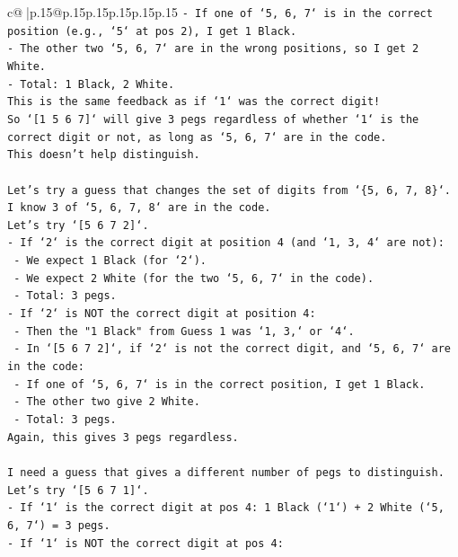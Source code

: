 \documentclass{article}
\begin{document}
{\begin{supertabular}{c@{$\;$}|p{.15\linewidth}@{}p{.15\linewidth}p{.15\linewidth}p{.15\linewidth}p{.15\linewidth}p{.15\linewidth}}
{{{\texttt{{-} If one of `5, 6, 7` is in the correct position (e.g., `5` at pos 2), I get 1 Black.} \\
\texttt{{-} The other two `5, 6, 7` are in the wrong positions, so I get 2 White.} \\
\texttt{{-} Total: 1 Black, 2 White.} \\
\texttt{This is the same feedback as if `1` was the correct digit!} \\
\texttt{So `{[}1 5 6 7{]}` will give 3 pegs regardless of whether `1` is the correct digit or not, as long as `5, 6, 7` are in the code.} \\
\texttt{This doesn't help distinguish.} \\
\\ 
\texttt{Let's try a guess that changes the set of digits from `\{5, 6, 7, 8\}`.} \\
\texttt{I know 3 of `5, 6, 7, 8` are in the code.} \\
\texttt{Let's try `{[}5 6 7 2{]}`.} \\
\texttt{{-} If `2` is the correct digit at position 4 (and `1, 3, 4` are not):} \\
\texttt{  {-} We expect 1 Black (for `2`).} \\
\texttt{  {-} We expect 2 White (for the two `5, 6, 7` in the code).} \\
\texttt{  {-} Total: 3 pegs.} \\
\texttt{{-} If `2` is NOT the correct digit at position 4:} \\
\texttt{  {-} Then the "1 Black" from Guess 1 was `1, 3,` or `4`.} \\
\texttt{  {-} In `{[}5 6 7 2{]}`, if `2` is not the correct digit, and `5, 6, 7` are in the code:} \\
\texttt{    {-} If one of `5, 6, 7` is in the correct position, I get 1 Black.} \\
\texttt{    {-} The other two give 2 White.} \\
\texttt{    {-} Total: 3 pegs.} \\
\texttt{Again, this gives 3 pegs regardless.} \\
\\ 
\texttt{I need a guess that gives a different number of pegs to distinguish.} \\
\texttt{Let's try `{[}5 6 7 1{]}`.} \\
\texttt{{-} If `1` is the correct digit at pos 4: 1 Black (`1`) + 2 White (`5, 6, 7`) = 3 pegs.} \\
\texttt{{-} If `1` is NOT the correct digit at pos 4:} \\
}}}
\end{supertabular}}
\end{document}
